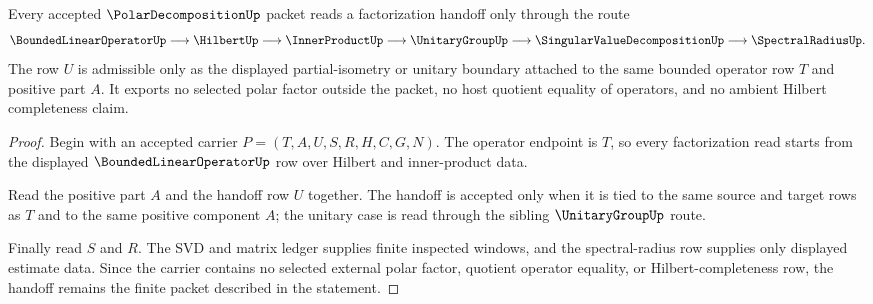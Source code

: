 \begin{theorem}
\label{thm:polar-decomposition-partial-isometry-handoff}
Every accepted $\PolarDecompositionUp$ packet reads a factorization handoff only through the route
$$
\BoundedLinearOperatorUp \longrightarrow \HilbertUp \longrightarrow \InnerProductUp \longrightarrow \UnitaryGroupUp \longrightarrow \SingularValueDecompositionUp \longrightarrow \SpectralRadiusUp .
$$
The row $U$ is admissible only as the displayed partial-isometry or unitary boundary attached to the same bounded operator row $T$ and positive part $A$. It exports no selected polar factor outside the packet, no host quotient equality of operators, and no ambient Hilbert completeness claim.
\end{theorem}
\begin{proof}
Begin with an accepted carrier $P=(T,A,U,S,R,H,C,G,N)$. The operator endpoint is $T$, so every factorization read starts from the displayed $\BoundedLinearOperatorUp$ row over Hilbert and inner-product data.

Read the positive part $A$ and the handoff row $U$ together. The handoff is accepted only when it is tied to the same source and target rows as $T$ and to the same positive component $A$; the unitary case is read through the sibling $\UnitaryGroupUp$ route.

Finally read $S$ and $R$. The SVD and matrix ledger supplies finite inspected windows, and the spectral-radius row supplies only displayed estimate data. Since the carrier contains no selected external polar factor, quotient operator equality, or Hilbert-completeness row, the handoff remains the finite packet described in the statement.
\end{proof}



